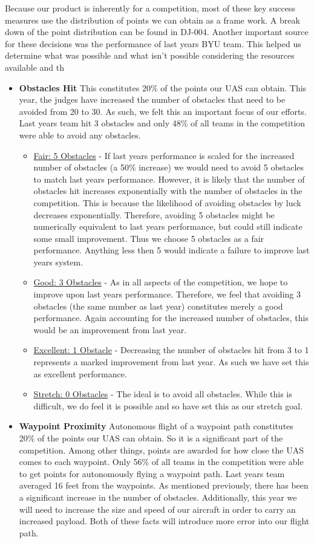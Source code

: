 \documentclass[]{auvsi_doc}
\begin{document}
Because our product is inherently for a competition, most of these key success measures use the distribution of points we can obtain as a frame work. A break down of the point distribution can be found in DJ-004. Another important source for these decisions was the performance of last years BYU team. This helped us determine what was possible and what isn't possible considering the resources available and th

\begin{itemize}
\item \textbf{Obstacles Hit} This constitutes 20\% of the points our UAS can obtain. This year, the judges have increased the number of obstacles that need to be avoided from 20 to 30. As such, we felt this an important focus of our efforts. Last years team hit 3 obstacles and only 48\% of all teams in the competition were able to avoid any obstacles. 
	\begin{itemize}
	\item  \underline{Fair: 5 Obstacles} -  If last years performance is scaled for the increased number of obstacles (a 50\% increase) we would need to avoid 5 obstacles to match last years performance. However, it is likely that the number of obstacles hit increases exponentially with the number of obstacles in the competition. This is because the likelihood of avoiding obstacles by luck decreases exponentially. Therefore, avoiding 5 obstacles might be numerically equivalent to last years performance, but could still indicate some small improvement. Thus we choose 5 obstacles as a fair performance. Anything less then 5 would indicate a failure to improve last years system.
	\item \underline{Good: 3 Obstacles} -  As in all aspects of the competition, we hope to improve upon last years performance. Therefore, we feel that avoiding 3 obstacles (the same number as last year) constitutes merely a good performance. Again accounting for the increased number of obstacles, this would be an improvement from last year.
	\item \underline{Excellent: 1 Obstacle} -  Decreasing the number of obstacles hit from 3 to 1 represents a marked improvement from last year. As such we have set this as excellent performance.
	\item \underline{Stretch: 0 Obstacles} - The ideal is to avoid all obstacles. While this is difficult, we do feel it is possible and so have set this as our stretch goal.
	\end{itemize}
\item \textbf{Waypoint Proximity} Autonomous flight of a waypoint path constitutes 20\% of the points our UAS can obtain. So it is a significant part of the competition. Among other things, points are awarded for how close the UAS comes to each waypoint. Only 56\% of all teams in the competition were able to get points for autonomously flying a waypoint path. Last years team averaged 16 feet from the waypoints.  As mentioned previously, there has been a significant increase in the number of obstacles. Additionally, this year we will need to increase the size and speed of our aircraft in order to carry an increased payload. Both of these facts will introduce more error into our flight path. 

\end{itemize}
\end{document}
